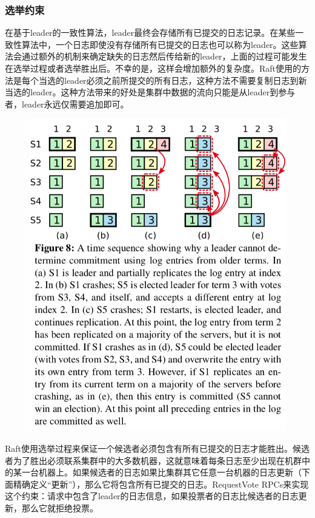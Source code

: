\documentclass[journal]{IEEEtran}
\begin{document}
\subsubsection{选举约束}
在基于leader的一致性算法，leader最终会存储所有已提交的日志记录。在某些一致性算法中，一个日志即使没有存储所有已提交的日志也可以称为leader。这些算法会通过额外的机制来确定缺失的日志然后传给新的leader，上面的过程可能发生在选举过程或者选举胜出后。不幸的是，这样会增加额外的复杂度。Raft使用的方法是每个当选的leader必须之前所提交的所有日志，这种方法不需要复制日志到新当选的leader。这种方法带来的好处是集群中数据的流向只能是从leader到参与者，leader永远仅需要追加即可。

\begin{figure}[htbp]
\begin{center}
\includegraphics[width=1\linewidth]{./fig8.png}
\end{center}
\end{figure}

Raft使用选举过程来保证一个候选者必须包含有所有已提交的日志才能胜出。候选者为了胜出必须联系集群中的大多数机器，这就意味着每条日志至少出现在机群中的某一台机器上。如果候选者的日志如果比集群其它任意一台机器的日志更新（下面精确定义“更新”），那么它将包含所有已提交的日志。RequestVote RPCs来实现这个约束：请求中包含了leader的日志信息，如果投票者的日志比候选者的日志更新，那么它就拒绝投票。
\end{document}
